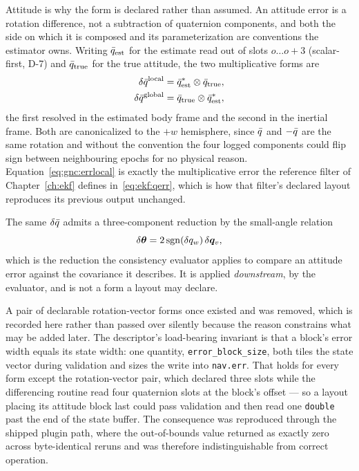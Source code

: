 Attitude is why the form is declared rather than assumed. An attitude
error is a rotation difference, not a subtraction of quaternion
components, and both the side on which it is composed and its
parameterization are conventions the estimator owns. Writing
$\bar{q}_{\mathrm{est}}$ for the estimate read out of slots
$o \ldots o+3$ (scalar-first, D-7) and $\bar{q}_{\mathrm{true}}$ for the
true attitude, the two multiplicative forms are
\begin{align}
  \delta\bar{q}^{\mathrm{local}}
    &= \bar{q}_{\mathrm{est}}^{*} \otimes \bar{q}_{\mathrm{true}},
  \label{eq:gnc:errlocal} \\
  \delta\bar{q}^{\mathrm{global}}
    &= \bar{q}_{\mathrm{true}} \otimes \bar{q}_{\mathrm{est}}^{*},
  \label{eq:gnc:errglobal}
\end{align}
the first resolved in the estimated body frame and the second in the
inertial frame. Both are canonicalized to the $+w$ hemisphere, since
$\bar{q}$ and $-\bar{q}$ are the same rotation and without the
convention the four logged components could flip sign between
neighbouring epochs for no physical reason.
Equation~\eqref{eq:gnc:errlocal} is exactly the multiplicative error the
reference filter of Chapter~\ref{ch:ekf} defines
in~\eqref{eq:ekf:qerr}, which is how that filter's declared layout
reproduces its previous output unchanged.

The same $\delta\bar{q}$ admits a three-component reduction by the
small-angle relation
\begin{equation}
  \delta\bm{\theta} = 2\,\mathrm{sgn}(\delta q_w)\,\delta\bm{q}_v,
  \label{eq:gnc:errrotvec}
\end{equation}
which is the reduction the consistency evaluator applies to compare an
attitude error against the covariance it describes. It is applied
\emph{downstream}, by the evaluator, and is not a form a layout may declare.

A pair of declarable rotation-vector forms once existed and was removed,
which is recorded here rather than passed over silently because the reason
constrains what may be added later. The descriptor's load-bearing invariant
is that a block's error width equals its state width: one quantity,
\texttt{error\_block\_size}, both tiles the state vector during validation
and sizes the write into \texttt{nav.err}. That holds for every form except
the rotation-vector pair, which declared three slots while the differencing
routine read four quaternion slots at the block's offset --- so a layout
placing its attitude block last could pass validation and then read one
\texttt{double} past the end of the state buffer. The consequence was
reproduced through the shipped plugin path, where the out-of-bounds value
returned as exactly zero across byte-identical reruns and was therefore
indistinguishable from correct operation.

